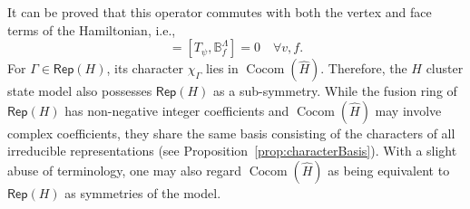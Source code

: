 \documentclass[a4paper,11pt]{article}
\theoremstyle{theorem}
\theoremstyle{remark}
\newcommand{\Av}{\mathbb{A}}
\newcommand{\Bf}{\mathbb{B}}
\newcommand{\Rep}{\mathsf{Rep}}
\newcommand{\Cocom}{\operatorname{Cocom}}
\begin{document}
It can be proved that this operator commutes with both the vertex and face terms of the Hamiltonian, i.e.,
\begin{equation}
    [T_{\psi}, \Av_{v_s}^{\lambda}] = [T_{\psi}, \Bf_f^{\Lambda}] = 0 \quad \forall v, f.
\end{equation}
For $\Gamma \in \Rep(H)$, its character $\chi_{\Gamma}$ lies in $\Cocom(\hat{H})$. 
Therefore, the $H$ cluster state model also possesses $\Rep(H)$ as a sub-symmetry. 
While the fusion ring of $\Rep(H)$ has non-negative integer coefficients and $\Cocom(\hat{H})$ may involve complex coefficients, 
they share the same basis consisting of the characters of all irreducible representations (see Proposition~\ref{prop:characterBasis}). 
With a slight abuse of terminology, one may also regard $\Cocom(\hat{H})$ as being equivalent to $\Rep(H)$ as symmetries of the model.
\end{document}
